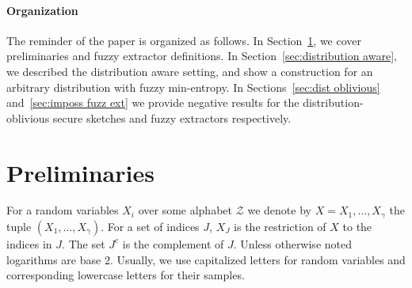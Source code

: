 \documentclass[11pt]{article}
\newcommand{\secref}[1]{\mbox{Section~\ref{#1}}}
\begin{document}
\paragraph{Organization} The reminder of the paper is organized as follows.  In \secref{sec:preliminaries}, we cover preliminaries and fuzzy extractor definitions.  In \secref{sec:distribution aware}, we described the distribution aware setting, and show a construction for an arbitrary distribution with fuzzy min-entropy.  In Sections~\ref{sec:dist oblivious} and~\ref{sec:imposs fuzz ext} we provide negative results for the distribution-oblivious secure sketches and fuzzy extractors respectively.

\section{Preliminaries}
\label{sec:preliminaries}
For a random variables $X_i$ over some alphabet $\mathcal{Z}$ we denote by $X = X_1,..., X_\gamma$  the tuple $(X_1,\dots, X_\gamma)$.  For a set of indices $J$, $X_{J}$ is the restriction of $X$ to the indices in $J$.  The set $J^c$ is the complement of $J$.  Unless otherwise noted logarithms are base $2$.
Usually, we use capitalized letters for random variables and corresponding lowercase letters for their samples.
\end{document}
